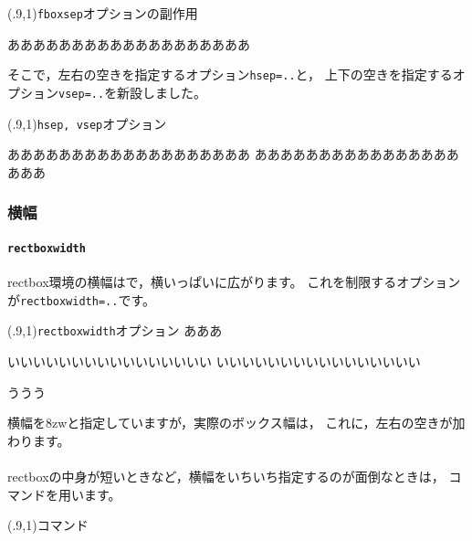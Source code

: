 \begin{showEx}(.9,1){\texttt{fboxsep}オプションの副作用}
\begin{rectbox}[fboxsep=1zw]
あああああああああああああああああああ

\end{rectbox}

\end{showEx}

そこで，左右の空きを指定するオプション\verb+hsep=..+と，
上下の空きを指定するオプション\verb+vsep=..+を新設しました。

\begin{showEx}(.9,1){\texttt{hsep, vsep}オプション}
\begin{rectbox}[hsep=3zw,vsep=1zw]
あああああああああああああああああああ
あああああああああああああああああああ

\end{rectbox}

\end{showEx}

\subsubsection{横幅}
\paragraph{\texttt{rectboxwidth}}
\textsf{rectbox}環境の横幅はで，横いっぱいに広がります。
これを制限するオプションが\verb+rectboxwidth=..+です。

\begin{showEx}(.9,1){\texttt{rectboxwidth}オプション}
あああ
\begin{rectbox}[rectboxwidth=8zw]
いいいいいいいいいいいいいいいい
いいいいいいいいいいいいいいいい
\end{rectbox}

ううう
\end{showEx}

横幅を8zwと指定していますが，実際のボックス幅は，
これに，左右の空きが加わります。

\paragraph{}
\textsf{rectbox}の中身が短いときなど，横幅をいちいち指定するのが面倒なときは，
コマンドを用います。

\begin{showEx}(.9,1){コマンド}
\end{showEx}

